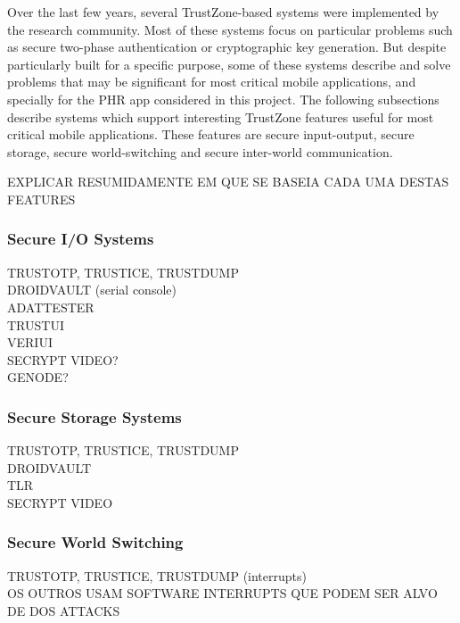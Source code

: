 
Over the last few years, several TrustZone-based systems were implemented by the research community. Most of these systems focus on particular problems such as secure two-phase authentication or cryptographic key generation. But despite particularly built for a specific purpose, some of these systems describe and solve problems that may be significant for most critical mobile applications, and specially for the \ac{PHR} app considered in this project. The following subsections describe systems which support interesting TrustZone features useful for most critical mobile applications. These features are secure input-output, secure storage, secure world-switching and secure inter-world communication.

EXPLICAR RESUMIDAMENTE EM QUE SE BASEIA CADA UMA DESTAS FEATURES

\subsubsection{Secure I/O Systems}

TRUSTOTP, TRUSTICE, TRUSTDUMP\\
DROIDVAULT (serial console)\\
ADATTESTER\\
TRUSTUI\\
VERIUI\\
SECRYPT VIDEO?\\
GENODE?

\subsubsection{Secure Storage Systems}

TRUSTOTP, TRUSTICE, TRUSTDUMP\\
DROIDVAULT\\
TLR\\
SECRYPT VIDEO

\subsubsection{Secure World Switching}

TRUSTOTP, TRUSTICE, TRUSTDUMP (interrupts)\\
OS OUTROS USAM SOFTWARE INTERRUPTS QUE PODEM SER ALVO DE DOS ATTACKS

